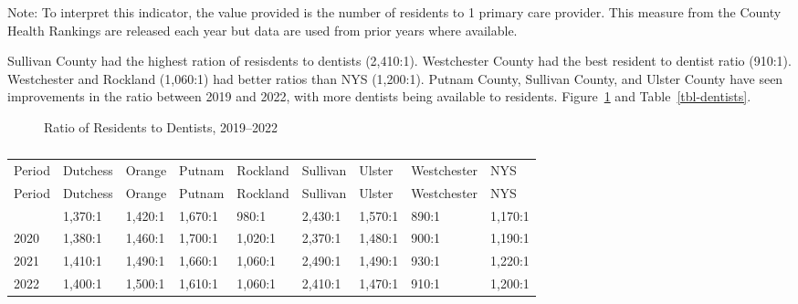 \documentclass[
  english,
  letterpaper,
]{report}
\begin{document}
\begin{tcolorbox}[enhanced jigsaw, breakable, leftrule=.75mm, title=\textcolor{quarto-callout-note-color}{\faInfo}\hspace{0.5em}{Note}, bottomrule=.15mm, opacityback=0, left=2mm, colback=white, bottomtitle=1mm, coltitle=black, colbacktitle=quarto-callout-note-color!10!white, colframe=quarto-callout-note-color-frame, opacitybacktitle=0.6, toptitle=1mm, titlerule=0mm, arc=.35mm, rightrule=.15mm, toprule=.15mm]

Note: To interpret this indicator, the value provided is the number of
residents to 1 primary care provider. This measure from the County
Health Rankings are released each year but data are used from prior
years where available.

\end{tcolorbox}

Sullivan County had the highest ration of resisdents to dentists
(2,410:1). Westchester County had the best resident to dentist ratio
(910:1). Westchester and Rockland (1,060:1) had better ratios than NYS
(1,200:1). Putnam County, Sullivan County, and Ulster County have seen
improvements in the ratio between 2019 and 2022, with more dentists
being available to residents. Figure~\ref{fig-dentists} and
Table~\ref{tbl-dentists}.

\begin{figure}


\caption{\label{fig-dentists}Ratio of Residents to Dentists, 2019--2022}

\end{figure}%

\begin{longtable}[]{@{}lllllllll@{}}

\caption{\label{tbl-dentists}Ratio of Residents to Dentists, 2019--2022}

\tabularnewline

\caption{}\label{T_3a5bf}\tabularnewline
\toprule\noalign{}
Period & Dutchess & Orange & Putnam & Rockland & Sullivan & Ulster &
Westchester & NYS \\
\midrule\noalign{}
\endfirsthead
\toprule\noalign{}
Period & Dutchess & Orange & Putnam & Rockland & Sullivan & Ulster &
Westchester & NYS \\
\midrule\noalign{}
\endhead
\bottomrule\noalign{}
\endlastfoot
2019 & 1,370:1 & 1,420:1 & 1,670:1 & 980:1 & 2,430:1 & 1,570:1 & 890:1 &
1,170:1 \\
2020 & 1,380:1 & 1,460:1 & 1,700:1 & 1,020:1 & 2,370:1 & 1,480:1 & 900:1
& 1,190:1 \\
2021 & 1,410:1 & 1,490:1 & 1,660:1 & 1,060:1 & 2,490:1 & 1,490:1 & 930:1
& 1,220:1 \\
2022 & 1,400:1 & 1,500:1 & 1,610:1 & 1,060:1 & 2,410:1 & 1,470:1 & 910:1
& 1,200:1 \\

\end{longtable}
\end{document}
